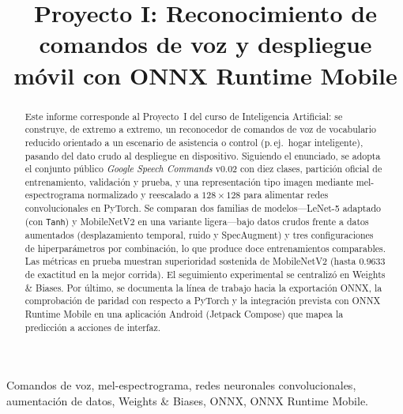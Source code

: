 \documentclass[conference]{IEEEtran}
\begin{document}
\title{Proyecto I: Reconocimiento de comandos de voz y
despliegue móvil con ONNX Runtime Mobile}

\author{
\and
{}
\and
{}
}

\maketitle

\begin{abstract}
Este informe corresponde al Proyecto~I del curso de Inteligencia Artificial: se construye, de extremo a extremo, un reconocedor de comandos de voz de vocabulario reducido orientado a un escenario de asistencia o control (p.\,ej.\ hogar inteligente), pasando del dato crudo al despliegue en dispositivo. Siguiendo el enunciado, se adopta el conjunto público \textit{Google Speech Commands} v0.02 con diez clases, partición oficial de entrenamiento, validación y prueba, y una representación tipo imagen mediante mel-espectrograma normalizado y reescalado a $128 \times 128$ para alimentar redes convolucionales en PyTorch. Se comparan dos familias de modelos---LeNet-5 adaptado (con \texttt{Tanh}) y MobileNetV2 en una variante ligera---bajo datos crudos frente a datos aumentados (desplazamiento temporal, ruido y SpecAugment) y tres configuraciones de hiperparámetros por combinación, lo que produce doce entrenamientos comparables. Las métricas en prueba muestran superioridad sostenida de MobileNetV2 (hasta $0.9633$ de exactitud en la mejor corrida). El seguimiento experimental se centralizó en Weights \& Biases. Por último, se documenta la línea de trabajo hacia la exportación ONNX, la comprobación de paridad con respecto a PyTorch y la integración prevista con ONNX Runtime Mobile en una aplicación Android (Jetpack Compose) que mapea la predicción a acciones de interfaz.
\end{abstract}

\begin{IEEEkeywords}
Comandos de voz, mel-espectrograma, redes neuronales convolucionales, aumentación de datos, Weights \& Biases, ONNX, ONNX Runtime Mobile.
\end{IEEEkeywords}
\end{document}
